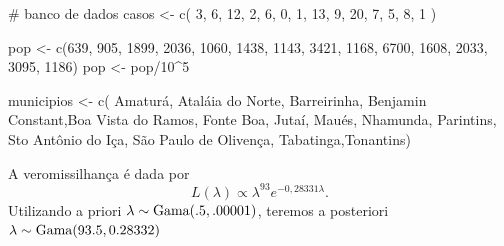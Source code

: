 \documentclass[
  letterpaper,
  DIV=11,
  numbers=noendperiod]{scrreprt}
\newenvironment{Shaded}{\begin{snugshade}}{\end{snugshade}}
\newcommand{\CommentTok}[1]{\textcolor[rgb]{0.37,0.37,0.37}{#1}}
\newcommand{\DecValTok}[1]{\textcolor[rgb]{0.68,0.00,0.00}{#1}}
\newcommand{\FunctionTok}[1]{\textcolor[rgb]{0.28,0.35,0.67}{#1}}
\newcommand{\NormalTok}[1]{\textcolor[rgb]{0.00,0.23,0.31}{#1}}
\newcommand{\OtherTok}[1]{\textcolor[rgb]{0.00,0.23,0.31}{#1}}
\newcommand{\SpecialCharTok}[1]{\textcolor[rgb]{0.37,0.37,0.37}{#1}}
\newcommand{\StringTok}[1]{\textcolor[rgb]{0.13,0.47,0.30}{#1}}
\theoremstyle{plain}
\theoremstyle{definition}
\theoremstyle{definition}
\theoremstyle{remark}
\begin{document}
\begin{Shaded}
\begin{Highlighting}[]
\CommentTok{\# banco de dados}
\NormalTok{casos }\OtherTok{\textless{}{-}} \FunctionTok{c}\NormalTok{( }\DecValTok{3}\NormalTok{, }\DecValTok{6}\NormalTok{, }\DecValTok{12}\NormalTok{, }\DecValTok{2}\NormalTok{, }\DecValTok{6}\NormalTok{, }\DecValTok{0}\NormalTok{, }\DecValTok{1}\NormalTok{, }\DecValTok{13}\NormalTok{, }\DecValTok{9}\NormalTok{, }\DecValTok{20}\NormalTok{, }\DecValTok{7}\NormalTok{, }\DecValTok{5}\NormalTok{, }\DecValTok{8}\NormalTok{, }\DecValTok{1}\NormalTok{ )   }

\NormalTok{pop }\OtherTok{\textless{}{-}} \FunctionTok{c}\NormalTok{(}\DecValTok{639}\NormalTok{, }\DecValTok{905}\NormalTok{, }\DecValTok{1899}\NormalTok{, }\DecValTok{2036}\NormalTok{, }\DecValTok{1060}\NormalTok{, }\DecValTok{1438}\NormalTok{, }\DecValTok{1143}\NormalTok{, }\DecValTok{3421}\NormalTok{, }\DecValTok{1168}\NormalTok{, }\DecValTok{6700}\NormalTok{, }\DecValTok{1608}\NormalTok{, }\DecValTok{2033}\NormalTok{, }\DecValTok{3095}\NormalTok{, }\DecValTok{1186}\NormalTok{)}
\NormalTok{pop }\OtherTok{\textless{}{-}}\NormalTok{ pop}\SpecialCharTok{/}\DecValTok{10}\SpecialCharTok{\^{}}\DecValTok{5}

\NormalTok{municipios }\OtherTok{\textless{}{-}} \FunctionTok{c}\NormalTok{( }\StringTok{\textquotesingle{}Amaturá\textquotesingle{}}\NormalTok{, }\StringTok{\textquotesingle{}Ataláia do Norte\textquotesingle{}}\NormalTok{, }\StringTok{\textquotesingle{}Barreirinha\textquotesingle{}}\NormalTok{, }\StringTok{\textquotesingle{}Benjamin Constant\textquotesingle{}}\NormalTok{,}\StringTok{\textquotesingle{}Boa Vista do Ramos\textquotesingle{}}\NormalTok{, }\StringTok{\textquotesingle{}Fonte Boa\textquotesingle{}}\NormalTok{, }\StringTok{\textquotesingle{}Jutaí\textquotesingle{}}\NormalTok{, }\StringTok{\textquotesingle{}Maués\textquotesingle{}}\NormalTok{, }\StringTok{\textquotesingle{}Nhamunda\textquotesingle{}}\NormalTok{, }\StringTok{\textquotesingle{}Parintins\textquotesingle{}}\NormalTok{, }\StringTok{\textquotesingle{}Sto Antônio do Iça\textquotesingle{}}\NormalTok{, }\StringTok{\textquotesingle{}São Paulo de Olivença\textquotesingle{}}\NormalTok{, }\StringTok{\textquotesingle{}Tabatinga\textquotesingle{}}\NormalTok{,}\StringTok{\textquotesingle{}Tonantins\textquotesingle{}}\NormalTok{)}
\end{Highlighting}
\end{Shaded}

A veromissilhança é dada por
\[L(\lambda)\propto \lambda^{93}e^{-0,28331\lambda }.\] Utilizando a
priori \(\lambda\sim\hbox{Gama}(.5,.00001)\), teremos a posteriori
\(\lambda\sim\hbox{Gama}(93.5,0.28332)\)
\end{document}
